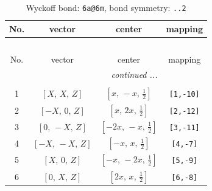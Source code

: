 \documentclass[fleqn,8pt]{jsarticle}
\begin{document}
\begin{longtable}{cccc}
\caption{Wyckoff bond: {\tt 6a@6m}, bond symmetry: {\tt ..2}}
 \\
 \hline \hline
No. & vector & center & mapping \\ \hline \endfirsthead

\multicolumn{3}{l}{\tablename\ \thetable{}} \\
 \hline \hline
No. & vector & center & mapping \\ \hline \endhead

 \hline \hline
\multicolumn{3}{r}{\footnotesize\it continued ...} \\ \endfoot

 \hline \hline
\multicolumn{3}{r}{} \\ \endlastfoot

1 & $\left[ X,\, X,\, Z \right]$ & $\left[ x,\, - x,\, \frac{1}{2} \right]$ & {\tt [1,-10]} \\ \hline
2 & $\left[ - X,\, 0,\, Z \right]$ & $\left[ x,\, 2 x,\, \frac{1}{2} \right]$ & {\tt [2,-12]} \\ \hline
3 & $\left[ 0,\, - X,\, Z \right]$ & $\left[ - 2 x,\, - x,\, \frac{1}{2} \right]$ & {\tt [3,-11]} \\ \hline
4 & $\left[ - X,\, - X,\, Z \right]$ & $\left[ - x,\, x,\, \frac{1}{2} \right]$ & {\tt [4,-7]} \\ \hline
5 & $\left[ X,\, 0,\, Z \right]$ & $\left[ - x,\, - 2 x,\, \frac{1}{2} \right]$ & {\tt [5,-9]} \\ \hline
6 & $\left[ 0,\, X,\, Z \right]$ & $\left[ 2 x,\, x,\, \frac{1}{2} \right]$ & {\tt [6,-8]} \\
\end{longtable}
\renewcommand{\arraystretch}{1.2}
\end{document}
